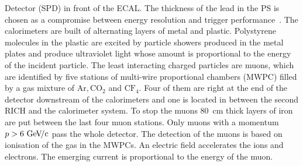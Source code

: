 Detector (SPD) in front of the ECAL. The thickness of the lead in the PS is
chosen as a compromise between energy resolution and trigger
performance~\cite{Preshower}. The calorimeters are built of alternating layers
of metal and plastic. Polystyrene molecules in the plastic are excited by
particle showers produced in the metal plates and produce ultraviolet light
whose amount is proportional to the energy of the incident particle. The least
interacting charged particles are muons, which are identified by five stations
of multi-wire proportional chambers (MWPC) filled by a gas mixture of $\mathrm{Ar,
CO_2}$ and $\mathrm{CF_4}$. Four of them are right at the end of the detector
downstream of the calorimeters and one is located in between the second RICH
and the calorimeter system. To stop the muons \SI{80}{cm} thick layers of iron
are put between the last four muon stations. Only muons with a momentum $p >
\SI{6}{\ensuremath{{\mathrm{\,Ge\kern -0.1em V\!/}c}}}$ pass the whole detector. The detection of the muons is based on
ionisation of the gas in the MWPCs. An electric field accelerates the ions and
electrons. The emerging current is proportional to the energy of the muon.
